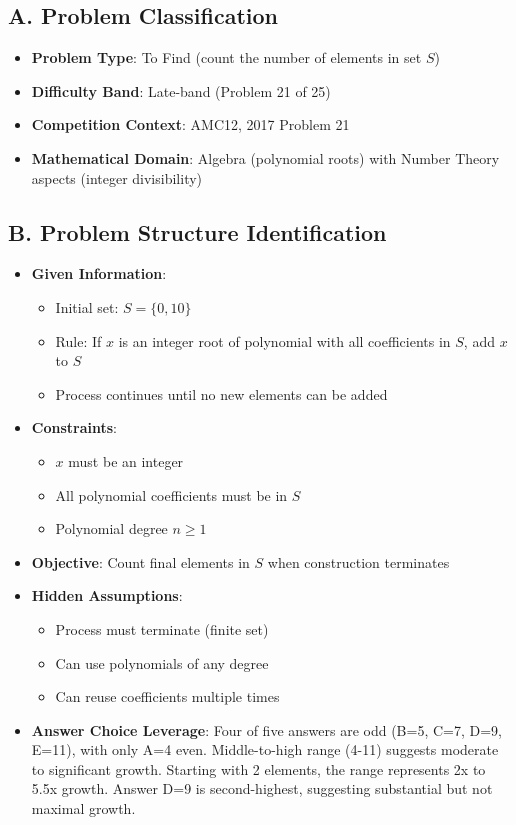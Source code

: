 \documentclass[12pt]{article}
\begin{document}
\begin{problemconfigbox}
\subsection*{A. Problem Classification}
\begin{itemize}[leftmargin=*]
    \item \textbf{Problem Type}: To Find (count the number of elements in set $S$)
    \item \textbf{Difficulty Band}: Late-band (Problem 21 of 25)
    \item \textbf{Competition Context}: AMC12, 2017 Problem 21
    \item \textbf{Mathematical Domain}: Algebra (polynomial roots) with Number Theory aspects (integer divisibility)
\end{itemize}

\subsection*{B. Problem Structure Identification}
\begin{itemize}[leftmargin=*]
    \item \textbf{Given Information}: 
    \begin{itemize}
        \item Initial set: $S = \{0, 10\}$
        \item Rule: If $x$ is an integer root of polynomial with all coefficients in $S$, add $x$ to $S$
        \item Process continues until no new elements can be added
    \end{itemize}
    \item \textbf{Constraints}: 
    \begin{itemize}
        \item $x$ must be an integer
        \item All polynomial coefficients must be in $S$
        \item Polynomial degree $n \geq 1$
    \end{itemize}
    \item \textbf{Objective}: Count final elements in $S$ when construction terminates
    \item \textbf{Hidden Assumptions}: 
    \begin{itemize}
        \item Process must terminate (finite set)
        \item Can use polynomials of any degree
        \item Can reuse coefficients multiple times
    \end{itemize}
    \item \textbf{Answer Choice Leverage}: Four of five answers are odd (B=5, C=7, D=9, E=11), with only A=4 even. Middle-to-high range (4-11) suggests moderate to significant growth. Starting with 2 elements, the range represents 2x to 5.5x growth. Answer D=9 is second-highest, suggesting substantial but not maximal growth.
\end{itemize}


\end{problemconfigbox}
\end{document}
